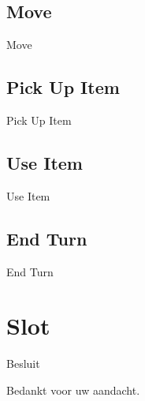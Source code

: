 \documentclass[t]{beamer}
\begin{document}
\subsection{Move}
\begin{frame}{Move}
\begin{center}
\end{center}
\end{frame}

\subsection{Pick Up Item}
\begin{frame}{Pick Up Item}
\begin{center}
\end{center}
\end{frame}

\subsection{Use Item}
\begin{frame}{Use Item}
\begin{center}
\end{center}
\end{frame}

\subsection{End Turn}
\begin{frame}{End Turn}
\begin{center}
\end{center}
\end{frame}


\section{Slot}
\begin{frame}{Besluit}
\vspace{0.8in}
\begin{center}
Bedankt voor uw aandacht.
\end{center}
\end{frame}
\end{document}
